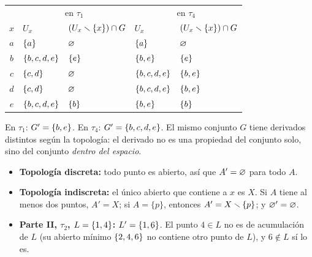 \begin{ejemplo}[Ejemplo: $G=\s{b,e}$ en $\tau_1$ y en $\tau_4$ (Parte I)]
\begin{center}\small\renewcommand{\arraystretch}{1.15}
\begin{tabular}{@{}c|ll|ll@{}}
 & \multicolumn{2}{c|}{en $\tau_1$} & \multicolumn{2}{c}{en $\tau_4$}\\
$x$ & $U_x$ & $(U_x\smallsetminus\{x\})\cap G$ & $U_x$ & $(U_x\smallsetminus\{x\})\cap G$\\ \hline
$a$ & $\{a\}$ & $\varnothing$ & $\{a\}$ & $\varnothing$\\
$b$ & $\{b,c,d,e\}$ & $\{e\}$ & $\{b,e\}$ & $\{e\}$\\
$c$ & $\{c,d\}$ & $\varnothing$ & $\{b,c,d,e\}$ & $\{b,e\}$\\
$d$ & $\{c,d\}$ & $\varnothing$ & $\{b,c,d,e\}$ & $\{b,e\}$\\
$e$ & $\{b,c,d,e\}$ & $\{b\}$ & $\{b,e\}$ & $\{b\}$
\end{tabular}\end{center}
En $\tau_1$: $G'=\{b,e\}$. En $\tau_4$: $G'=\{b,c,d,e\}$. El mismo conjunto $G$ tiene derivados distintos según la
topología: el derivado no es una propiedad del conjunto solo, sino del conjunto \emph{dentro del espacio}.
\end{ejemplo}

\begin{ejemplo}
\begin{itemize}
\item \textbf{Topología discreta:} todo punto es abierto, así que $A'=\varnothing$ para todo $A$.
\item \textbf{Topología indiscreta:} el único abierto que contiene a $x$ es $X$. Si $A$ tiene al menos dos puntos,
$A'=X$; si $A=\{p\}$, entonces $A'=X\smallsetminus\{p\}$; y $\varnothing'=\varnothing$.
\item \textbf{Parte II, $\tau_2$, $L=\{1,4\}$:} $L'=\{1,6\}$. El punto $4\in L$ no es de acumulación de $L$ (su abierto
mínimo $\{2,4,6\}$ no contiene otro punto de $L$), y $6\notin L$ sí lo es.
\end{itemize}
\end{ejemplo}

